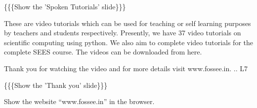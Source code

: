 \documentclass[a4paper,english]{article}
\begin{document}

\{\{\{Show the 'Spoken Tutorials' slide\}\}\}


These are video tutorials which can be used for teaching or self learning purposes by teachers and students respectively. Presently, we have 37 video tutorials on scientific computing using python. We also aim to complete video tutorials for the complete SEES course. The videos can be downloaded from here.

Thank you for watching the video and for more details visit www.fossee.in.
.. L7

\{\{\{Show the 'Thank you' slide\}\}\}

Show the website ``www.fossee.in'' in the browser.
\end{document}

